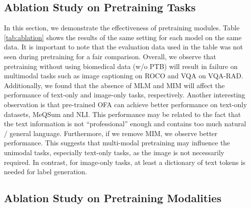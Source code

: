 \documentclass[10pt]{article} \usepackage[preprint]{tmlr}
\begin{document}
\subsection{Ablation Study on Pretraining Tasks} \label{sec:ablation_tasks}

In this section, we demonstrate the effectiveness of pretraining modules. Table \ref{tab:ablation} shows the results of the same setting for each model on the same data. It is important to note that the evaluation data used in the table was not seen during pretraining for a fair comparison. Overall, we observe that pretraining without using biomedical data (w/o PTB) will result in failure on multimodal tasks such as image captioning on ROCO and VQA on VQA-RAD. Additionally, we found that the absence of MLM and MIM will affect the performance of text-only and image-only tasks, respectively. Another interesting observation is that pre-trained OFA can achieve better performance on text-only datasets, MeQSum and NLI. This performance may be related to the fact that the text information is not ``professional'' enough and contains too much natural / general language. Furthermore, if we remove MIM, we observe better performance. This suggests that multi-modal pretraining may influence the unimodal tasks, especially text-only tasks, as the image is not necessarily required. In contrast, for image-only tasks, at least a dictionary of text tokens is needed for label generation.

\begin{table}
\centering
\caption{Ablation study on holding out task groups. All the results are obtained from the small-scale model.}
\label{tab:ablation}
\end{table}

\subsection{Ablation Study on Pretraining Modalities} \label{sec:modality_main}
\end{document}

